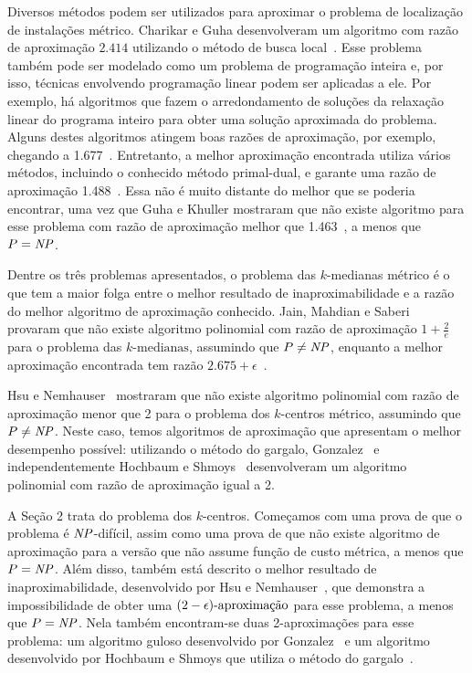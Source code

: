 \documentclass[12pt]{article}
\begin{document}
Diversos métodos podem ser utilizados para aproximar o problema de localização de instalações métrico. Charikar e Guha desenvolveram um algoritmo com razão de aproximação $2.414$ utilizando o método de busca local~\cite{Charikar&Guha'05}.  Esse problema também pode ser modelado como um problema de programação inteira e, por isso, técnicas envolvendo programação linear podem ser aplicadas a ele.  Por exemplo, há algoritmos que fazem o arredondamento de soluções da relaxação linear do programa inteiro para obter uma solução aproximada do problema.  Alguns destes algoritmos atingem boas razões de aproximação, por exemplo, chegando a 1.677~\cite{Byrka&Aardal'10}. Entretanto, a melhor aproximação encontrada utiliza vários métodos, incluindo o conhecido método primal-dual, e garante uma razão de aproximação 1.488~\cite{LI'13}. Essa não é muito distante do melhor que se poderia encontrar, uma vez que Guha e Khuller mostraram que não existe algoritmo para esse problema com razão de aproximação melhor que 1.463~\cite{GUHA1999228}, a menos que $P = \mathit{NP}$.


Dentre os três problemas apresentados, o problema das $k$-medianas métrico é o que tem a maior folga entre o melhor resultado de inaproximabilidade e a razão do melhor algoritmo de aproximação conhecido. Jain, Mahdian e Saberi~\cite{JMS'02} provaram que não existe algoritmo polinomial com razão de aproximação $1+ \frac{2}{e}$ para o problema das $k\text{-medianas}$, assumindo que $P \neq \mathit{NP}$, enquanto a melhor aproximação encontrada tem razão $2.675 + \epsilon$~\cite{BPRST'17}.


Hsu e Nemhauser~\cite{HSU1979209} mostraram que não existe algoritmo polinomial com razão de aproximação menor que 2 para o problema dos $k$-centros métrico, assumindo que $P\neq\mathit{NP}$. Neste caso, temos algoritmos de aproximação que apresentam o melhor desempenho possível: utilizando o método do gargalo, Gonzalez~\cite{GONZALEZ1985293} e independentemente Hochbaum e Shmoys~\cite{HochShmoys'85} desenvolveram um algoritmo polinomial com razão de aproximação igual a 2.

A Seção 2 trata do problema dos $k$-centros. Começamos com uma prova de que o problema é $\mathit{NP}$-difícil, assim como uma prova de que não existe algoritmo de aproximação para a versão que não assume função de custo métrica, a menos que $P = \mathit{NP}$. Além disso, também está descrito o melhor resultado de inaproximabilidade, desenvolvido por Hsu e Nemhauser~\cite{HSU1979209}, que demonstra a impossibilidade de obter uma ${(2-\epsilon)\text{-aproximação}}$ para esse problema, a menos que $P = \mathit{NP}$. Nela também encontram-se duas 2-aproximações para esse problema: um algoritmo guloso desenvolvido por Gonzalez~\cite{GONZALEZ1985293} e um algoritmo desenvolvido por Hochbaum e Shmoys que utiliza o método do gargalo~\cite{HSBottle}.
\end{document}
